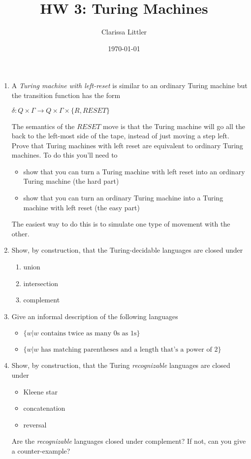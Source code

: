 \documentclass[11pt]{article}
\author{Clarissa Littler}
\date{\today}
\title{HW 3: Turing Machines}
\begin{document}
\maketitle
\begin{enumerate}
\item A \emph{Turing machine with left-reset} is similar to an ordinary Turing machine but the transition function has the form

$\delta : Q \times \Gamma \to Q \times \Gamma \times \{ R, RESET \}$

The semantics of the $RESET$ move is that the Turing machine will go all the back to the left-most side of the tape, instead of just moving a step left. Prove that Turing machines with left reset are equivalent to ordinary Turing machines. To do this you'll need to 

\begin{itemize}
\item show that you can turn a Turing machine with left reset into an ordinary Turing machine (the hard part)
\item show that you can turn an ordinary Turing machine into a Turing machine with left reset (the easy part)
\end{itemize}
The easiest way to do this is to simulate one type of movement with the other.

\item Show, by construction, that the Turing-decidable languages are closed under

\begin{enumerate}
\item union
\item intersection
\item complement
\end{enumerate}

\item Give an informal description of the following languages

\begin{itemize}
\item $\{ w | w \text{ contains twice as many 0s as 1s} \}$
\item $\{ w | w \text{ has matching parentheses and a length that's a power of 2}\}$
\end{itemize}

\item Show, by construction, that the Turing \emph{recognizable} languages are closed under

\begin{itemize}
\item Kleene star
\item concatenation
\item reversal
\end{itemize}
Are the \emph{recognizable} languages closed under complement? If not, can you give a counter-example?
\end{enumerate}
\end{document}
